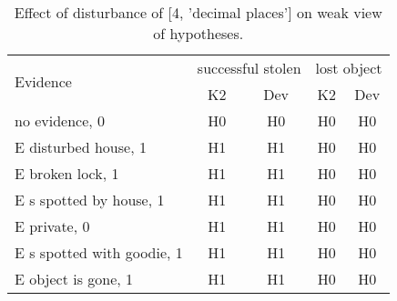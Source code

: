 \begin{table}\begin{tabular}{l|cc|cc}\toprule\multirow{2}{*}{Evidence} & \multicolumn{2}{c}{successful stolen}& \multicolumn{2}{c}{lost object}\\& {K2} & {Dev}& {K2} & {Dev}\\\midrule
no evidence, 0 & H0&H0&H0&H0\\E disturbed house, 1 & H1&H1&H0&H0\\E broken lock, 1 & H1&H1&H0&H0\\E s spotted by house, 1 & H1&H1&H0&H0\\E private, 0 & H1&H1&H0&H0\\E s spotted with goodie, 1 & H1&H1&H0&H0\\E object is gone, 1 & H1&H1&H0&H0\\\bottomrule\end{tabular}\caption{Effect of disturbance of [4, 'decimal places'] on weak view of hypotheses.}\end{table}